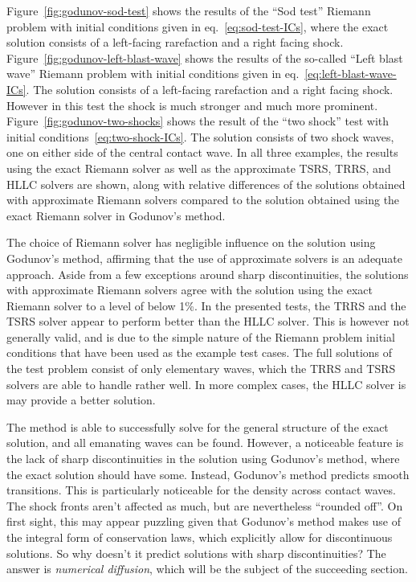 Figure~\ref{fig:godunov-sod-test} shows the results of the ``Sod test'' Riemann problem with initial
conditions given in eq.~\ref{eq:sod-test-ICs}, where the exact solution consists of a left-facing
rarefaction and a right facing shock. Figure~\ref{fig:godunov-left-blast-wave} shows the results of
the so-called ``Left blast wave'' Riemann problem with initial conditions given in
eq.~\ref{eq:left-blast-wave-ICs}. The solution consists of a left-facing rarefaction and a right
facing shock. However in this test the shock is much stronger and much more prominent.
Figure~\ref{fig:godunov-two-shocks} shows the result of the ``two shock'' test with initial
conditions~\ref{eq:two-shock-ICs}. The solution consists of two shock waves, one on either side of
the central contact wave. In all three examples, the results using the exact Riemann solver as well
as the approximate TSRS, TRRS, and HLLC solvers are shown, along with relative differences of the
solutions obtained with approximate Riemann solvers compared to the solution obtained using the
exact Riemann solver in Godunov's method.

The choice of Riemann solver has negligible influence on the solution using Godunov's method,
affirming that the use of approximate solvers is an adequate approach. Aside from a few exceptions
around sharp discontinuities, the solutions with approximate Riemann solvers agree with the
solution using the exact Riemann solver to a level of below 1\%. In the presented tests, the
TRRS and the TSRS solver appear to perform better than the HLLC solver. This is however not
generally valid, and is due to the simple nature of the Riemann problem initial conditions that
have been used as the example test cases. The full solutions of the test problem consist of only
elementary waves, which the TRRS and TSRS solvers are able to handle rather well. In more complex
cases, the HLLC solver is may provide a better solution.

The method is able to successfully solve for the general structure of the exact solution, and all
emanating waves can be found. However, a noticeable feature is the lack of sharp discontinuities in
the solution using Godunov's method, where the exact solution should have some. Instead, Godunov's
method predicts smooth transitions. This is particularly noticeable for the density across contact
waves. The shock fronts aren't affected as much, but are nevertheless ``rounded off''.
On first sight, this may appear puzzling given that Godunov's method makes use of the integral form
of conservation laws, which explicitly allow for discontinuous solutions. So why doesn't it predict
solutions with sharp discontinuities? The answer is \emph{numerical diffusion}, which will be the
subject of the succeeding section.









